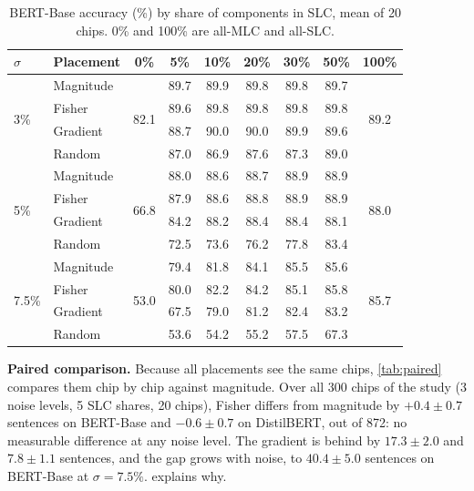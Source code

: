 \begin{table}[t]
\centering\footnotesize
\caption{BERT-Base accuracy (\%) by share of components in SLC, mean of 20 chips. 0\% and 100\% are
all-MLC and all-SLC.}\label{tab:share}
\setlength{\tabcolsep}{3.2pt}
\begin{tabular}{@{}llccccccc@{}}
\toprule
$\sigma$ & Placement & 0\% & 5\% & 10\% & 20\% & 30\% & 50\% & 100\% \\
\midrule
\multirow{4}{*}{3\%}
 & Magnitude & \multirow{4}{*}{82.1} & 89.7 & 89.9 & 89.8 & 89.8 & 89.7 & \multirow{4}{*}{89.2} \\
 & Fisher    & & 89.6 & 89.8 & 89.8 & 89.8 & 89.8 & \\
 & Gradient  & & 88.7 & 90.0 & 90.0 & 89.9 & 89.6 & \\
 & Random    & & 87.0 & 86.9 & 87.6 & 87.3 & 89.0 & \\
\midrule
\multirow{4}{*}{5\%}
 & Magnitude & \multirow{4}{*}{66.8} & 88.0 & 88.6 & 88.7 & 88.9 & 88.9 & \multirow{4}{*}{88.0} \\
 & Fisher    & & 87.9 & 88.6 & 88.8 & 88.9 & 88.9 & \\
 & Gradient  & & 84.2 & 88.2 & 88.4 & 88.4 & 88.1 & \\
 & Random    & & 72.5 & 73.6 & 76.2 & 77.8 & 83.4 & \\
\midrule
\multirow{4}{*}{7.5\%}
 & Magnitude & \multirow{4}{*}{53.0} & 79.4 & 81.8 & 84.1 & 85.5 & 85.6 & \multirow{4}{*}{85.7} \\
 & Fisher    & & 80.0 & 82.2 & 84.2 & 85.1 & 85.8 & \\
 & Gradient  & & 67.5 & 79.0 & 81.2 & 82.4 & 83.2 & \\
 & Random    & & 53.6 & 54.2 & 55.2 & 57.5 & 67.3 & \\
\bottomrule
\end{tabular}
\end{table}

\textbf{Paired comparison.} Because all placements see the same chips, \cref{tab:paired} compares them
chip by chip against magnitude. Over all 300 chips of the study (3 noise levels, 5 SLC shares, 20 chips),
Fisher differs from magnitude by $+0.4\pm0.7$ sentences on BERT-Base and $-0.6\pm0.7$ on DistilBERT, out
of 872: no measurable difference at any noise level. The gradient is behind by $17.3\pm2.0$ and
$7.8\pm1.1$ sentences, and the gap grows with noise, to $40.4\pm5.0$ sentences on BERT-Base at
$\sigma=7.5\%$.  explains why.

